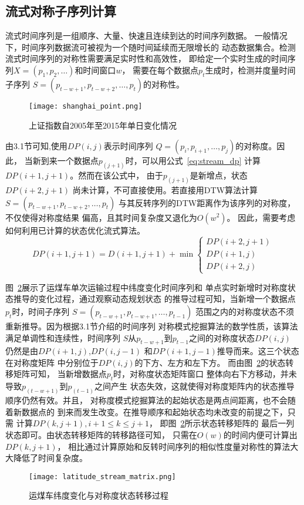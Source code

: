 \subsection{流式对称子序列计算}
流式时间序列是一组顺序、大量、快速且连续到达的时间序列数据。
一般情况下，时间序列数据流可被视为一个随时间延续而无限增长的
动态数据集合。检测流式时间序列的对称性需要满足实时性和高效性，
即给定一个实时生成的时间序列$X=(p_1,p_2,\dots)$和时间窗口$w$，
需要在每个数据点$p_t$生成时，检测并度量时间子序列
$S=\left(p_{t-w+1},p_{t-w+2},\dots,p_t \right)$的对称性。
\begin{figure}
  \centering
  \texttt{[image: shanghai\_point.png]}
  \caption{上证指数自2005年至2015年单日变化情况}
  \label{fig:shanghai_point}
\end{figure}
由3.1节可知,使用$DP\left(i,j\right)$表示时间序列
$Q=(p_i,p_{i+1},\dots,p_j )$的对称度。因此，
当新到来一个数据点$p_(j+1)$时，可以用公式~\ref{eq:stream_dp}
计算$DP\left(i+1,j+1\right)$。然而在该公式中，
由于$p_(j+1)$是新增点，状态$DP\left(i+2,j+1\right)$
尚未计算，不可直接使用。若直接用DTW算法计算
$S=\left(p_{t-w+1},p_{t-w+2},…,p_t \right)$
与其反转序列的DTW距离作为该序列的对称度，不仅使得对称度结果
偏高，且其时间复杂度又退化为$O\left(w^2\right)$。
因此，需要考虑如何利用已计算的状态优化流式算法。
\begin{equation}
  DP(i+1, j+1)=D(i+1, j+1)+\min \left\{\begin{array}{c}
    D P(i+2, j+1) \\
    D P(i+1, j) \\
    D P(i+2, j)
    \end{array}\right.
  \label{eq:stream_dp}
\end{equation}

图~\ref{fig:latitude_stream_matrix}展示了运煤车单次运输过程中纬度变化时间序列和
单点实时新增时对称度状态推导的变化过程，通过观察动态规划状态
的推导过程可知，当新增一个数据点$p_t$时，时间子序列
$S=\left(p_{t-w+1},p_{t-w+1},…,p_{t-1} \right)$
范围之内的对称度状态不须重新推导。因为根据3.1节介绍的时间序列
对称模式挖掘算法的数学性质，该算法满足单调性和连续性，时间序列
$S$从$p_{t-w+1}$到$p_{t-1}$之间的对称度状态$DP\left(i,j\right)$
仍然是由$DP\left(i+1,j\right)$,$DP\left(i,j-1\right)$
和$DP\left(i+1,j-1\right)$推导而来。这三个状态在对称度矩阵
中分别位于$DP\left(i,j\right)$的下方、左方和左下方。
而由图~\ref{fig:latitude_stream_matrix}的状态转移矩阵可知，
当新增数据点$p_t$时，对称度状态矩阵窗口
整体向右下方移动，并未导致$p_(t-w+1)$到$p_(t-1)$之间产生
状态失效，这就使得对称度矩阵内的状态推导顺序仍然有效。并且，
对称度模式挖掘算法的起始状态是两点间距离，也不会随着新数据点的
到来而发生改变。在推导顺序和起始状态均未改变的前提之下，只需
计算$DP\left(k,j+1\right),i+1\leq k \leq j+1$，
即图~\ref{fig:latitude_stream_matrix}所示状态转移矩阵的
最后一列状态即可。由状态转移矩阵的转移路径可知，
只需在$O\left(w\right)$的时间内便可计算出$DP\left(k,j+1\right)$，
相比通过计算原始和反转时间序列的相似性度量对称性的算法大大降低了时间复杂度。
\begin{figure}
  \centering
  \texttt{[image: latitude\_stream\_matrix.png]}
  \caption{运煤车纬度变化与对称度状态转移过程}
  \label{fig:latitude_stream_matrix}
\end{figure}

